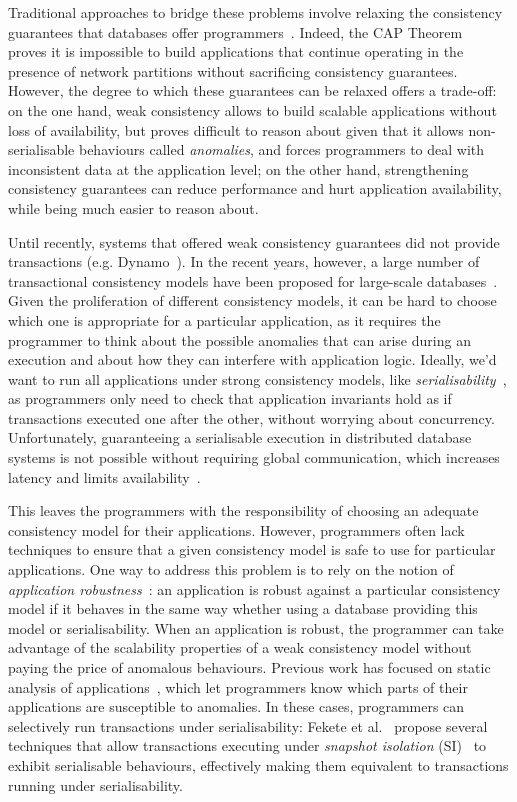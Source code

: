 Traditional approaches to bridge these problems involve relaxing the consistency guarantees that databases offer programmers~\citep{vogels-eventual}. Indeed, the CAP Theorem~\citep{cap-brewer, cap-theorem} proves it is impossible to build applications that continue operating in the presence of network partitions without sacrificing consistency guarantees. However, the degree to which these guarantees can be relaxed offers a trade-off: on the one hand, weak consistency allows to build scalable applications without loss of availability, but proves difficult to reason about given that it allows non-serialisable behaviours called \emph{anomalies}, and forces programmers to deal with inconsistent data at the application level; on the other hand, strengthening consistency guarantees can reduce performance and hurt application availability, while being much easier to reason about.

Until recently, systems that offered weak consistency guarantees did not provide transactions (e.g. Dynamo~\citep{dynamo-amz}). In the recent years, however, a large number of transactional consistency models have been proposed for large-scale databases~\citep{psi-intro, ardekani_nmsi, lloyd_cops, bailis_ramp}. Given the proliferation of different consistency models, it can be hard to choose which one is appropriate for a particular application, as it requires the programmer to think about the possible anomalies that can arise during an execution and about how they can interfere with application logic. Ideally, we'd want to run all applications under strong consistency models, like \emph{serialisability}~\citep{bernstein_concurrency}, as programmers only need to check that application invariants hold as if transactions executed one after the other, without worrying about concurrency. Unfortunately, guaranteeing a serialisable execution in distributed database systems is not possible without requiring global communication, which increases latency and limits availability~\citep{cap-theorem}.

This leaves the programmers with the responsibility of choosing an adequate consistency model for their applications. However, programmers often lack techniques to ensure that a given consistency model is safe to use for particular applications. One way to address this problem is to rely on the notion of \emph{application robustness}~\citep{fekete_ssi, concur_robustness}: an application is robust against a particular consistency model if it behaves in the same way whether using a database providing this model or serialisability. When an application is robust, the programmer can take advantage of the scalability properties of a weak consistency model without paying the price of anomalous behaviours. Previous work has focused on static analysis of applications~\citep{sudhir_static, cise_tool}, which let programmers know which parts of their applications are susceptible to anomalies. In these cases, programmers can selectively run transactions under serialisability: Fekete et al.~\citep{fekete_ssi, fekete_isolation_levels} propose several techniques that allow transactions executing under \emph{snapshot isolation} (SI)~\citep{sql-critique} to exhibit serialisable behaviours, effectively making them equivalent to transactions running under serialisability.

